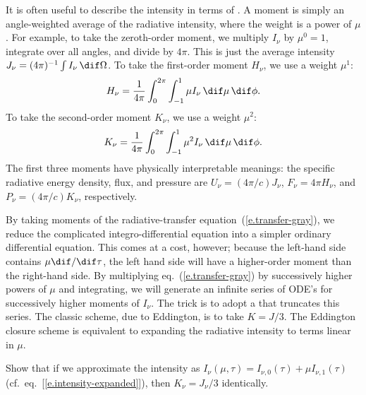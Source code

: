 \begin{sidebar}
\label{sb.intensity-moments}
It is often useful to describe the intensity in terms of . A moment is simply an angle-weighted average of the radiative intensity, where the weight is a power of $\mu$. For example, to take the zeroth-order moment, we multiply $I_{\nu}$ by $\mu^{0}=1$, integrate over all angles, and divide by $4\pi$. This is just the average intensity $J_{\nu} = (4\pi)^{-1}\int I_{\nu}\,\dif\Omega$. To take the first-order moment $H_{\nu}$, we use a weight $\mu^{1}$:
\[
	H_{\nu} = \frac{1}{4\pi}\int_{0}^{2\pi}\int_{-1}^{1}\mu I_{\nu}\,\dif\mu\,\dif\phi.
\]
To take the second-order moment $K_{\nu}$, we use a weight $\mu^{2}$:
\[
	K_{\nu} = \frac{1}{4\pi}\int_{0}^{2\pi}\int_{-1}^{1}\mu^{2} I_{\nu}\,\dif\mu\,\dif\phi.
\]
The first three moments have physically interpretable meanings: the specific radiative energy density, flux, and pressure are $U_{\nu} = (4\pi/c)J_{\nu}$, $F_{\nu} = 4\pi H_{\nu}$, and $P_{\nu} = (4\pi/c) K_{\nu}$, respectively.

By taking moments of the radiative-transfer equation~(\ref{e.transfer-gray}), we reduce the complicated integro-differential equation into a simpler ordinary differential equation. This comes at a cost, however; because the left-hand side contains $\mu\dif/\dif\tau$, the left hand side will have a higher-order moment than the right-hand side. By multiplying eq.~(\ref{e.transfer-gray}) by successively higher powers of $\mu$ and integrating, we will generate an infinite series of ODE's for successively higher moments of $I_{\nu}$.
The trick is to adopt a  that truncates this series. The classic scheme, due to Eddington, is to take $K = J/3$.
The Eddington closure scheme is equivalent to expanding the radiative intensity to terms linear in $\mu$.

\begin{exercisebox}
Show that if we approximate the intensity as $I_{\nu}(\mu,\tau) = I_{\nu,0}(\tau) + \mu I_{\nu,1}(\tau)$ (cf.\ eq.~[\ref{e.intensity-expanded}]), then $K_{\nu} = J_{\nu}/3$ identically.
\end{exercisebox}
\end{sidebar}

